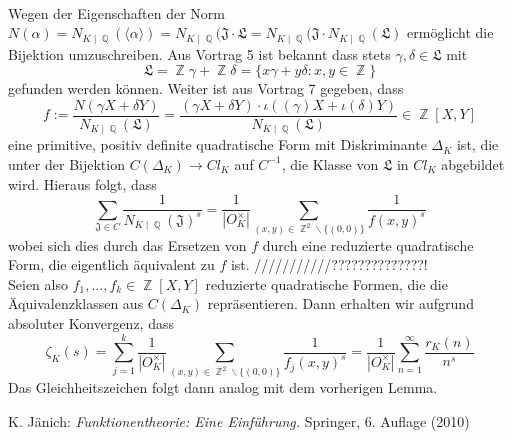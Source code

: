 \documentclass[10pt,a4paper]{article}
\DeclareMathOperator{\Q}{\mathbb{Q}}
\DeclareMathOperator{\Z}{\mathbb{Z}}
\begin{document}
\\
Wegen der Eigenschaften der Norm $N(\alpha)= N_{K\mid \Q}(\langle \alpha \rangle)=N_{K\mid \Q}(\mathfrak{J\cdot L}=N_{K\mid \Q}(\mathfrak{J}\cdot N_{K\mid \Q}(\mathfrak{L})$ ermöglicht die Bijektion umzuschreiben. Aus Vortrag 5 ist bekannt dass stets $\gamma, \delta \in \mathfrak{L}$ mit $$\mathfrak{L}= \Z\gamma+\Z\delta = \{x\gamma+y\delta\colon x,y \in \Z\}$$ gefunden werden können. Weiter ist aus Vortrag 7 gegeben, dass $$f:=\frac{N(\gamma X+\delta Y)}{N_{K\mid \Q}(\mathfrak{L})}=\frac{(\gamma X + \delta Y)\cdot \iota((\gamma)X+\iota(\delta)Y)}{N_{K\mid \Q}(\mathfrak{L})} \in \Z[X,Y]$$eine primitive, positiv definite quadratische Form mit Diskriminante $\Delta_K$ ist, die unter der Bijektion $C(\Delta_K)\rightarrow Cl_K$ auf $C^{-1}$, die Klasse von $\mathfrak{L}$ in $Cl_K$ abgebildet wird. Hieraus folgt, dass $$\sum_{\mathfrak{J}\in C}\frac{1}{N_{K\mid \Q }(\mathfrak{J})^s}=\frac{1}{|O_K^{\times}|}\sum_{(x,y)\in \Z^2\backslash \{ (0,0)\}}\frac{1}{f(x,y)^s}$$wobei sich dies durch das Ersetzen von $f$ durch eine reduzierte quadratische Form, die eigentlich äquivalent zu $f$ ist. ///////////??????????????!
\\
Seien also $f_1,...,f_k \in \Z[X,Y]$ reduzierte quadratische Formen, die die Äquivalenzklassen aus $C(\Delta_K)$ repräsentieren. Dann erhalten wir aufgrund absoluter Konvergenz, dass $$\zeta_K(s) = \sum_{j=1}^{k}\frac{1}{|O_K^{\times}|}\sum_{(x,y) \in \Z^2 \backslash \{(0,0)\}}\frac{1}{f_j(x,y)^s}=\frac{1}{|O_K^{\times}|}\sum_{n=1}^{\infty}\frac{r_K(n)}{n^s}$$
Das Gleichheitszeichen folgt dann analog mit dem vorherigen Lemma.

 
\begin{thebibliography}{99}
 K. Jänich: \textit{Funktionentheorie: Eine Einführung.} Springer, 6. Auflage (2010)

\end{thebibliography}
\end{document}
